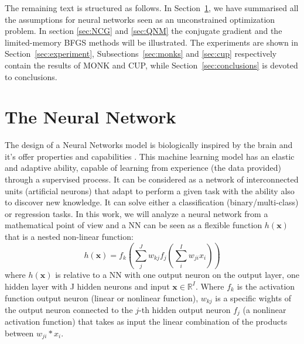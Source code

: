 The remaining text is structured as follows. In Section~\ref{sec:NN}, we have summarised all the assumptions for neural networks seen as an unconstrained optimization problem. In section \ref{sec:NCG} and \ref{sec:QNM} the conjugate gradient and the limited-memory BFGS methods will be illustrated. The experiments are shown in Section~\ref{sec:experiment}, Subsections~\ref{sec:monks} and \ref{sec:cup} respectively contain the results of MONK and CUP, while Section~\ref{sec:conclusions} is devoted to conclusions.



\section{The Neural Network}
\label{sec:NN}
The design of a Neural Networks model is biologically inspired by the brain and it's offer properties and capabilities \cite{Mitchell97,Goodfellow-et-al-2016, haykin2009neural}. This machine learning model has an elastic and adaptive ability, capable of learning from experience (the data provided) through a supervised process.  It can be considered as a network of interconnected units (artificial neurons) that adapt to perform a given task with the ability also to discover new knowledge. It can solve either a classification (binary/multi-class) or regression tasks. In this work, we will analyze a neural network from a mathematical point of view and a NN can be seen as a flexible function $h(\mathbf{x})$ that is a nested non-linear function:
\begin{equation}
    \label{eq:nn_function}
    h(\mathbf{x}) = f_k \left( \sum_{j}^J w_{kj} f_j \left( \sum_{i}^I w_{ji}x_i \right)\right) %
\end{equation}
where $h(\mathbf{x})$ is relative to a NN with one output neuron on the output layer, one hidden layer with J hidden neurons and input $\mathbf{x} \in \mathbb{R}^I$. Where $f_k$ is the activation function output neuron (linear or nonlinear function), $w_{kj}$ is a specific wights of the output neuron connected to the $j$-th hidden output neuron $f_j$ (a nonlinear activation function) that takes as input the linear combination of the products between $w_{ji}*x_i$.

